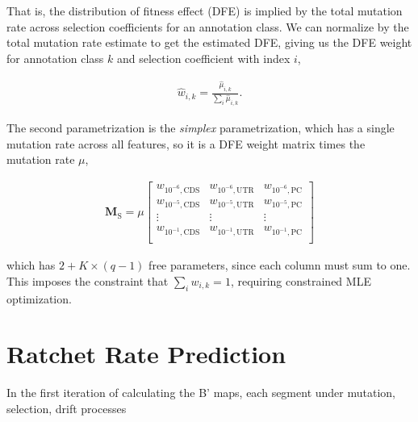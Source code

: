 \documentclass[11pt]{article}
\begin{document}
That is, the distribution of fitness effect (DFE) is implied by
the total mutation rate across selection coefficients for an annotation class.
We can normalize by the total mutation rate estimate to get the estimated DFE,
giving us the DFE weight for annotation class $k$ and selection coefficient
with index $i$,

\begin{align}
  \widehat{w}_{i,k} = \frac{\widehat{\mu}_{i,k}}{\sum_i \widehat{\mu}_{i,k}}.
\end{align}

The second parametrization is the \emph{simplex} parametrization, which has a
single mutation rate across all features, so it is a DFE weight matrix times
the mutation rate $\mu$, 

\begin{align}
  \mathbf{M}_\text{S} = \mu \begin{bmatrix}
    w_{10^{-6},\text{CDS}} & w_{10^{-6},\text{UTR}} & w_{10^{-6},\text{PC}} \\
    w_{10^{-5},\text{CDS}} & w_{10^{-5},\text{UTR}} & w_{10^{-5},\text{PC}} \\
    \vdots & \vdots & \vdots \\
    w_{10^{-1},\text{CDS}} & w_{10^{-1},\text{UTR}} & w_{10^{-1},\text{PC}} \\
  \end{bmatrix}
\end{align}

which has $2 + K \times (q-1)$ free parameters, since each column must sum to
one. This imposes the constraint that $\sum_i w_{i,k} = 1$, requiring
constrained MLE optimization. 

\section{Ratchet Rate Prediction}

In the first iteration of calculating the B' maps, each segment under mutation,
selection, drift processes

\printbibliography
\end{document}
